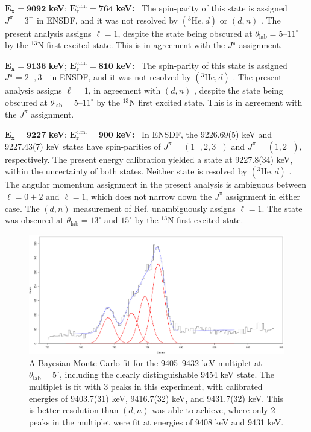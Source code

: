 \emph{$\mathbf{E_{x} = 9092}$} \textbf{keV}; \emph{$\mathbf{E^{\boldsymbol{\mathrm{c.m.}}}_{r} = 764}$} \textbf{keV:} \, 
The spin-parity of this state is assigned $J^{\pi} = 3^{-}$ in ENSDF, and it was not resolved by $(^{3}\mathrm{He},d)$ \cite{Erskine1966,Seth1967,Cage1971} or $(d,n)$ \cite{Fuchs1969}. The present analysis assigns $\ell=1$, despite the state being obscured at $\theta_{\mathrm{lab}} = 5$--$11^{\circ}$ by the $^{13}$N first excited state. This is in agreement with the $J^{\pi}$ assignment.

\emph{$\mathbf{E_{x} = 9136}$} \textbf{keV}; \emph{$\mathbf{E^{\boldsymbol{\mathrm{c.m.}}}_{r} = 810}$} \textbf{keV:} \, 
The spin-parity of this state is assigned $J^{\pi} = 2^{-},3^{-}$ in ENSDF, and it was not resolved by $(^{3}\mathrm{He},d)$ \cite{Erskine1966,Seth1967,Cage1971}. The present analysis assigns $\ell=1$, in agreement with $(d,n)$ \cite{Fuchs1969}, despite the state being obscured at $\theta_{\mathrm{lab}} = 5$--$11^{\circ}$ by the $^{13}$N first excited state. This is in agreement with the $J^{\pi}$ assignment.

\emph{$\mathbf{E_{x} = 9227}$} \textbf{keV}; \emph{$\mathbf{E^{\boldsymbol{\mathrm{c.m.}}}_{r} = 900}$} \textbf{keV:} \, 
In ENSDF, the 9226.69(5) keV and 9227.43(7) keV states have spin-parities of $J^{\pi} = (1^{-},2,3^{-})$ and $J^{\pi} = (1,2^{+})$, respectively. The present energy calibration yielded a state at 9227.8(34) keV, within the uncertainty of both states. Neither state is resolved by $(^{3}\mathrm{He},d)$ \cite{Erskine1966,Seth1967,Cage1971}. The angular momentum assignment in the present analysis is ambiguous between $\ell=0+2$ and $\ell=1$, which does not narrow down the $J^{\pi}$ assignment in either case. The $(d,n)$ measurement of Ref. \cite{Fuchs1969} unambiguously assigns $\ell=1$. The state was obscured at $\theta_{\mathrm{lab}} = 13^{\circ}$ and $15^{\circ}$ by the $^{13}$N first excited state.

\begin{figure}[t]
\centering
\includegraphics[width=6.5in]{Chapter-6/figs/5deg_9400keVGroup.png}
\caption{\label{fig:5deg_9400keVGroup}A Bayesian Monte Carlo fit for the 9405--9432 keV multiplet at $\theta_{\mathrm{lab}} = 5^{\circ}$, including the clearly distinguishable 9454 keV state. The multiplet is fit with 3 peaks in this experiment, with calibrated energies of 9403.7(31) keV, 9416.7(32) keV, and 9431.7(32) keV. This is better resolution than $(d,n)$ \cite{Fuchs1969} was able to achieve, where only 2 peaks in the multiplet were fit at energies of 9408 keV and 9431 keV.}
\end{figure}

